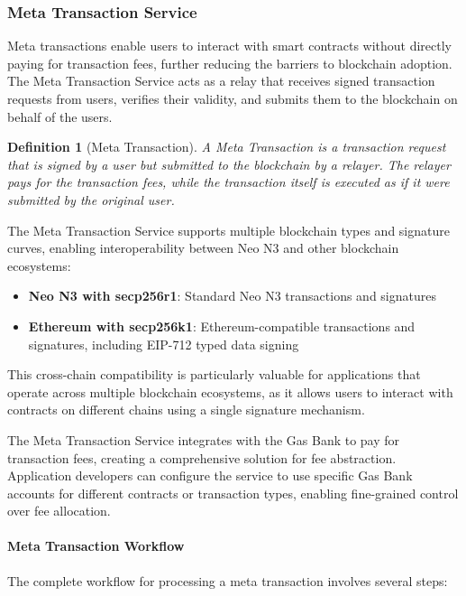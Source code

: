\documentclass{article}
\newtheorem{definition}{Definition}
\begin{document}
\subsubsection{Meta Transaction Service}
\label{subsubsec:meta-tx}

Meta transactions enable users to interact with smart contracts without directly paying for transaction fees, further reducing the barriers to blockchain adoption. The Meta Transaction Service acts as a relay that receives signed transaction requests from users, verifies their validity, and submits them to the blockchain on behalf of the users.



\begin{definition}[Meta Transaction]
A Meta Transaction is a transaction request that is signed by a user but submitted to the blockchain by a relayer. The relayer pays for the transaction fees, while the transaction itself is executed as if it were submitted by the original user.
\end{definition}

The Meta Transaction Service supports multiple blockchain types and signature curves, enabling interoperability between Neo N3 and other blockchain ecosystems:

\begin{itemize}
    \item \textbf{Neo N3 with secp256r1}: Standard Neo N3 transactions and signatures
    \item \textbf{Ethereum with secp256k1}: Ethereum-compatible transactions and signatures, including EIP-712 typed data signing
\end{itemize}

This cross-chain compatibility is particularly valuable for applications that operate across multiple blockchain ecosystems, as it allows users to interact with contracts on different chains using a single signature mechanism.

The Meta Transaction Service integrates with the Gas Bank to pay for transaction fees, creating a comprehensive solution for fee abstraction. Application developers can configure the service to use specific Gas Bank accounts for different contracts or transaction types, enabling fine-grained control over fee allocation.



\paragraph{Meta Transaction Workflow}
The complete workflow for processing a meta transaction involves several steps:
\end{document}
